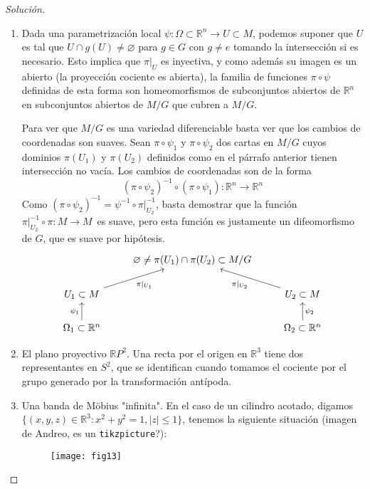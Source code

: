 \documentclass[spanish]{book}
\theoremstyle{definition}
\newcommand{\R}{\mathbb{R}}
\begin{document}
	\begin{proof}[Solución]\leavevmode
		\begin{enumerate}
			\item Dada una parametrización local $\psi:\Omega\subset\R^n\to U\subset M$, podemos suponer que $U$ es tal que $U\cap g(U)\neq\varnothing$ para $g\in G$ con $g\neq e$ tomando la intersección si es necesario. Esto implica que $\pi|_U$ es inyectiva, y como además su imagen es un abierto (la proyección cociente es abierta), la familia de funciones $\pi\circ\psi$ definidas de esta forma son homeomorfismos de subconjuntos abiertos de $\R^n$ en subconjuntos abiertos de $M/G$ que cubren a $M/G$.
			
			Para ver que $M/G$ es una variedad diferenciable basta ver que los cambios de coordenadas son suaves. Sean $\pi\circ\psi_1$ y $\pi\circ\psi_2$ dos cartas en $M/G$ cuyos dominios $\pi(U_1)$ y $\pi(U_2)$ definidos como en el párrafo anterior tienen intersección no vacía. Los cambios de coordenadas son de la forma
			\begin{equation}\label{ec:cambio-coord-traslacion}
				(\pi\circ\psi_2)^{-1}\circ(\pi\circ\psi_1):\R^n\to\R^n
			\end{equation}
			Como $(\pi\circ\psi_2)^{-1}=\psi^{-1}\circ\pi|_{U_2}^{-1}$, basta demostrar que la función $\pi|_{U_2}^{-1}\circ\pi:M\to M$ es suave, pero esta función es justamente un difeomorfismo de $G$, que es suave por hipótesis.
			\[\begin{tikzcd}
				&\varnothing\neq\pi(U_1)\cap\pi(U_2)\subset M/G\\
				U_1\subset M\arrow[swap]{ur}{\pi|_{U_1}}&&U_2\subset M\arrow{ul}{\pi|_{U_2}}\\
				\Omega_1\subset\R^n\arrow{u}{\psi_1}&&\Omega_2\subset\R^n\arrow[swap]{u}{\psi_2}
			\end{tikzcd}\]
			
			\item El plano proyectivo $\R P^2$. Una recta por el origen en $\R^3$ tiene dos representantes en $S^2$, que se identifican cuando tomamos el cociente por el grupo generado por la transformación antípoda.
			
			\item Una banda de Möbius "infinita". En el caso de un cilindro acotado, digamos $\{(x,y,z)\in\R^3:x^2+y^2=1,|z|\leq1\}$, tenemos la siguiente situación (imagen de Andreo, es un \texttt{tikzpicture}?):
			\begin{figure}[H]
				\centering
				\texttt{[image: fig13]}
			\end{figure}
			

\end{enumerate}
\end{proof}
\end{document}
